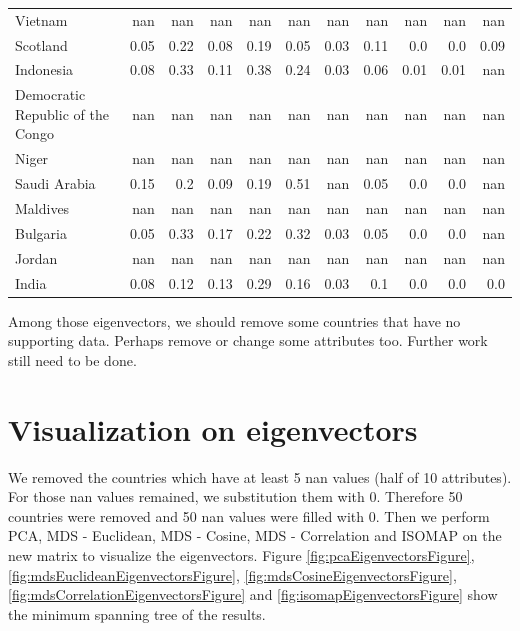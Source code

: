 \documentclass[11pt]{article}
\begin{document}
\begin{center}
\begin{longtable}{|p{70pt}|r|r|r|r|r|r|r|r|r|r|}
Vietnam& nan& nan& nan& nan& nan& nan& nan& nan& nan& nan\\
Scotland& 0.05& 0.22& 0.08& 0.19& 0.05& 0.03& 0.11& 0.0& 0.0& 0.09\\
Indonesia& 0.08& 0.33& 0.11& 0.38& 0.24& 0.03& 0.06& 0.01& 0.01& nan\\
Democratic Republic of the Congo& nan& nan& nan& nan& nan& nan& nan& nan& nan& nan\\
Niger& nan& nan& nan& nan& nan& nan& nan& nan& nan& nan\\
Saudi Arabia& 0.15& 0.2& 0.09& 0.19& 0.51& nan& 0.05& 0.0& 0.0& nan\\
Maldives& nan& nan& nan& nan& nan& nan& nan& nan& nan& nan\\
Bulgaria& 0.05& 0.33& 0.17& 0.22& 0.32& 0.03& 0.05& 0.0& 0.0& nan\\
Jordan& nan& nan& nan& nan& nan& nan& nan& nan& nan& nan\\
India& 0.08& 0.12& 0.13& 0.29& 0.16& 0.03& 0.1& 0.0& 0.0& 0.0\\

\hline

\end{longtable}
\end{center}

\par
Among those eigenvectors, we should remove some countries that have no supporting data. Perhaps remove or change some attributes too. Further work still need to be done.

\section{Visualization on eigenvectors}
We removed the countries which have at least 5 nan values (half of 10 attributes). For those nan values remained, we substitution them with $0$. Therefore 50 countries were removed and 50 nan values were filled with $0$. Then we perform PCA, MDS - Euclidean, MDS - Cosine, MDS - Correlation and ISOMAP on the new matrix to visualize the eigenvectors. Figure \ref{fig:pcaEigenvectorsFigure}, \ref{fig:mdsEuclideanEigenvectorsFigure}, \ref{fig:mdsCosineEigenvectorsFigure}, \ref{fig:mdsCorrelationEigenvectorsFigure} and \ref{fig:isomapEigenvectorsFigure} show the minimum spanning tree of the results.
\end{document}
